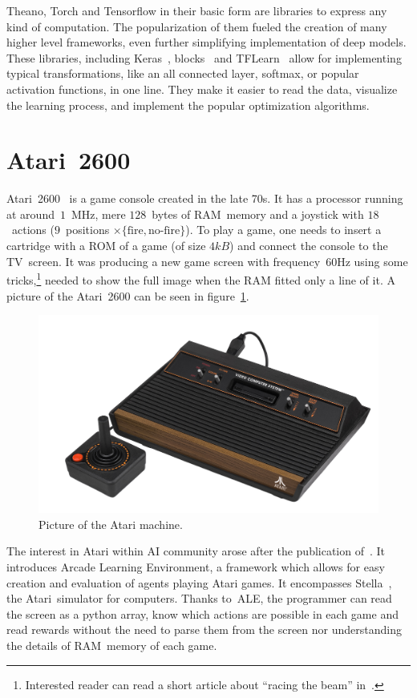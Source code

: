 \renewcommand{\figurename}{Figure}
Theano, Torch and Tensorflow in their basic form are libraries to express any kind of computation. The popularization of them fueled the creation of many higher level frameworks, even further simplifying implementation of deep models. These libraries, including Keras~\cite{keras}, blocks~\cite{blocks} and TFLearn~\cite{tflearn} allow for implementing typical transformations, like an all connected layer, softmax, or popular activation functions, in one line. They make it easier to read the data, visualize the learning process, and implement the popular optimization algorithms.

\section{Atari~2600}
Atari~2600~\cite{atari} is a game console created in the late 70s. It has a processor running at around~$1$~MHz, mere $128$~bytes of RAM~memory and a joystick with $18$~actions ($9$~positions $\times \{\mbox{fire}, \mbox{no-fire}\}$). To play a game, one needs to insert a cartridge with a ROM of a game (of size $4kB$) and connect the console to the TV~screen. It was producing a new game screen with frequency~$60$Hz using some tricks,\footnote{Interested reader can read a short article about ``racing the beam'' in~\cite{racing-beam}.} needed to show the full image when the RAM fitted only a line of it. A picture of the Atari~2600 can be seen in figure~\ref{atari-picture}.

\begin{figure}
  \centering
  \includegraphics[width=.8\linewidth]{images/atari.jpg}
  \caption{Picture of the Atari machine.}\label{atari-picture}
\end{figure}

The interest in Atari within AI community arose after the publication of~\cite{ale}. It introduces Arcade Learning Environment, a framework which allows for easy creation and evaluation of agents playing Atari games. It encompasses Stella~\cite{stella}, the Atari~simulator for computers. Thanks to~ALE, the programmer can read the screen as a python array, know which actions are possible in each game and read rewards without the need to parse them from the screen nor understanding the details of RAM~memory of each game.

